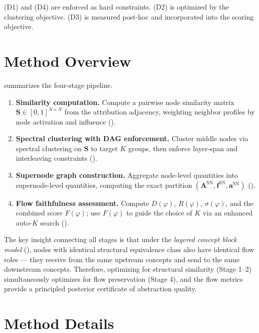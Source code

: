 \documentclass[11pt]{article}
\newcommand{\bS}{\mathbf{S}}
\newcommand{\1}{\mathbbm{1}}
\newcommand{\snAdj}{\mathbf{A}^{\mathrm{SN}}}
\newcommand{\snInf}{\mathbf{f}^{\mathrm{SN}}}
\newcommand{\snAct}{\mathbf{a}^{\mathrm{SN}}}
\begin{document}
(D1) and (D4) are enforced as hard constraints.
(D2) is optimized by the clustering objective.
(D3) is measured post-hoc and incorporated into the scoring objective.

\section{Method Overview}
\label{sec:overview}

 summarizes the four-stage pipeline.

\begin{enumerate}[leftmargin=2em, label=\textbf{Stage \arabic*.}]
  \item \textbf{Similarity computation.} Compute a pairwise node similarity matrix $\bS \in [0,1]^{N \times N}$ from the attribution adjacency, weighting neighbor profiles by node activation and influence ().
  \item \textbf{Spectral clustering with DAG enforcement.} Cluster middle nodes via spectral clustering on $\bS$ to target $K$ groups, then enforce layer-span and interleaving constraints ().
  \item \textbf{Supernode graph construction.} Aggregate node-level quantities into supernode-level quantities, computing the exact partition $(\snAdj, \snInf, \snAct)$ ().
  \item \textbf{Flow faithfulness assessment.} Compute $D(\varphi)$, $R(\varphi)$, $\sigma(\varphi)$, and the combined score $F(\varphi)$; use $F(\varphi)$ to guide the choice of $K$ via an enhanced auto-$K$ search ().
\end{enumerate}

The key insight connecting all stages is that under the \emph{layered concept block model} (), nodes with identical structural equivalence class also have identical flow roles — they receive from the same upstream concepts and send to the same downstream concepts.
Therefore, optimizing for structural similarity (Stage 1--2) simultaneously optimizes for flow preservation (Stage 4), and the flow metrics provide a principled posterior certificate of abstraction quality.

\section{Method Details}
\label{sec:details}
\end{document}
